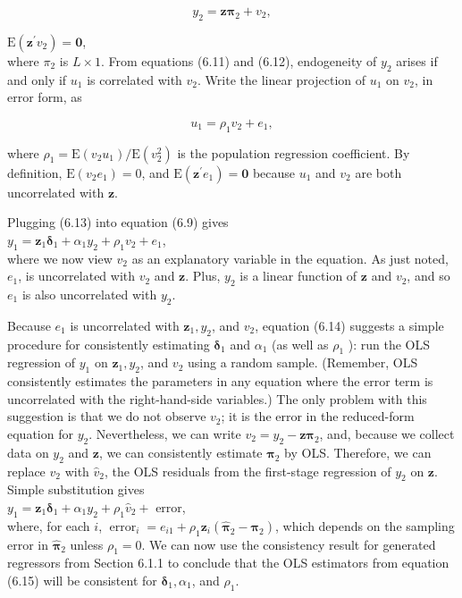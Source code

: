 \documentclass[10pt]{article}
\begin{document}
\begin{equation*}
y_{2}=\mathbf{z} \boldsymbol{\pi}_{2}+v_{2}, \tag{6.11}
\end{equation*}


$\mathrm{E}\left(\mathbf{z}^{\prime} v_{2}\right)=\mathbf{0}$,\\
where $\pi_{2}$ is $L \times 1$. From equations (6.11) and (6.12), endogeneity of $y_{2}$ arises if and only if $u_{1}$ is correlated with $v_{2}$. Write the linear projection of $u_{1}$ on $v_{2}$, in error form, as


\begin{equation*}
u_{1}=\rho_{1} v_{2}+e_{1}, \tag{6.13}
\end{equation*}


where $\rho_{1}=\mathrm{E}\left(v_{2} u_{1}\right) / \mathrm{E}\left(v_{2}^{2}\right)$ is the population regression coefficient. By definition, $\mathrm{E}\left(v_{2} e_{1}\right)=0$, and $\mathrm{E}\left(\mathbf{z}^{\prime} e_{1}\right)=\mathbf{0}$ because $u_{1}$ and $v_{2}$ are both uncorrelated with $\mathbf{z}$.

Plugging (6.13) into equation (6.9) gives\\
$y_{1}=\mathbf{z}_{1} \boldsymbol{\delta}_{1}+\alpha_{1} y_{2}+\rho_{1} v_{2}+e_{1}$,\\
where we now view $v_{2}$ as an explanatory variable in the equation. As just noted, $e_{1}$, is uncorrelated with $v_{2}$ and $\mathbf{z}$. Plus, $y_{2}$ is a linear function of $\mathbf{z}$ and $v_{2}$, and so $e_{1}$ is also uncorrelated with $y_{2}$.

Because $e_{1}$ is uncorrelated with $\mathbf{z}_{1}, y_{2}$, and $v_{2}$, equation (6.14) suggests a simple procedure for consistently estimating $\boldsymbol{\delta}_{1}$ and $\alpha_{1}$ (as well as $\rho_{1}$ ): run the OLS regression of $y_{1}$ on $\mathbf{z}_{1}, y_{2}$, and $v_{2}$ using a random sample. (Remember, OLS consistently estimates the parameters in any equation where the error term is uncorrelated with the right-hand-side variables.) The only problem with this suggestion is that we do not observe $v_{2}$; it is the error in the reduced-form equation for $y_{2}$. Nevertheless, we can write $v_{2}=y_{2}-\mathbf{z} \boldsymbol{\pi}_{2}$, and, because we collect data on $y_{2}$ and $\mathbf{z}$, we can consistently estimate $\boldsymbol{\pi}_{2}$ by OLS. Therefore, we can replace $v_{2}$ with $\hat{v}_{2}$, the OLS residuals from the first-stage regression of $y_{2}$ on $\mathbf{z}$. Simple substitution gives\\
$y_{1}=\mathbf{z}_{1} \boldsymbol{\delta}_{1}+\alpha_{1} y_{2}+\rho_{1} \hat{v}_{2}+$ error,\\
where, for each $i$, $\operatorname{error}_{i}=e_{i 1}+\rho_{1} \mathbf{z}_{i}\left(\hat{\boldsymbol{\pi}}_{2}-\boldsymbol{\pi}_{2}\right)$, which depends on the sampling error in $\hat{\boldsymbol{\pi}}_{2}$ unless $\rho_{1}=0$. We can now use the consistency result for generated regressors from Section 6.1.1 to conclude that the OLS estimators from equation (6.15) will be consistent for $\boldsymbol{\delta}_{1}, \alpha_{1}$, and $\rho_{1}$.
\end{document}
